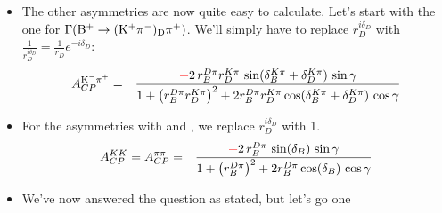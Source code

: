 \begin{enumerate}[a)]
{\begin{itemize}
\begin{eqnarray*}
            \cos(\delta_B^{D\pi}-\delta_D^{K\pi})\,\cos\gamma +
            \sin(\delta_B^{D\pi}-\delta_D^{K\pi})\,\sin\gamma\right)\right)
      \end{eqnarray*}
      The decay rate asymmetry is:
      \begin{eqnarray*}
        A_{CP}^{\Kp\pim} & = & 
        \frac{
          {\color{red}+}2r_D^{K\pi}\,r_B^{D\pi}\,\sin(\delta_B-\delta_D^{K\pi})\,\sin\gamma
        }{
          {r_D^{K\pi}}^2 + (r_B^{D\pi})^2 + 2r_D^{K\pi}\,r_B^{D\pi}\, \cos(\delta_B^{D\pi}-\delta_D^{K\pi})\,\cos\gamma
        } 
        \\ & = & 
        \frac{
          -2\,\frac{r_B}{r_D^{K\pi}}\,\sin(\delta_B-\delta_D^{K\pi})\,\sin\gamma
        }{
          1 + \left(\frac{r_B}{r_D^{K\pi}}\right)^2 
          + 2\frac{r_B}{r_D^{K\pi}} \cos(\delta_B-\delta_D^{K\pi})\,\cos\gamma
        } 
        \\ & & \mbox{which is the same as}
        \\ & = & 
        \frac{
          -2\,\frac{r_D^{K\pi}}{r_B}\,\sin(\delta_B-\delta_D^{K\pi})\,\sin\gamma
        }{
          1 + \left(\frac{r_D^{K\pi}}{r_B}\right)^2 
          + 2\frac{r_D^{K\pi}}{r_B} \cos(\delta_B-\delta_D^{K\pi})\,\cos\gamma
        } 
      \end{eqnarray*}
  \item The other asymmetries are now quite easy to calculate. Let's
    start with the one for  $\Gamma({\rm B^+ \to ({\rm K^+} {\rm \pi^-})_D
    \pi^+})$. We'll simply have to replace $r_D^{i\delta_D}$
    with $\frac{1}{r_D^{i\delta_D}} = \frac{1}{r_D} e^{-i\delta_D}$:
    \begin{eqnarray*}
      A_{CP}^{{\rm K^-}{\rm \pi^+}} & = &
      \frac{
        {\color{red}+}2\, r_B^{D\pi} r_D^{K\pi}\,\sin(\delta_B^{K\pi}+\delta_D^{K\pi})\,\sin\gamma
      }{
        1 + \left(r_B^{D\pi} r_D^{K\pi}\right)^2 
        + 2 r_B^{D\pi} r_D^{K\pi} \cos(\delta_B^{K\pi} + \delta_D^{K\pi})\,\cos\gamma
      } 
    \end{eqnarray*}
  \item For the asymmetries with  and , we replace $r_D^{i\delta_D}$ with 1.
    \begin{eqnarray*}
      A_{CP}^{KK} = A_{CP}^{\pi\pi} & = &
      \frac{
        {\color{red}+}2\, r_B^{D\pi} \,\sin(\delta_B)\,\sin\gamma
      }{
        1 + \left(r_B^{D\pi}\right)^2 
        + 2 r_B^{D\pi} \cos(\delta_B)\,\cos\gamma
      } 
    \end{eqnarray*}
  \item We've now answered the question as stated, but let's go one

\end{itemize}}
\end{enumerate}
